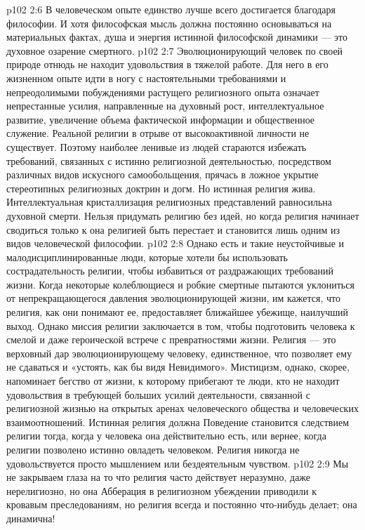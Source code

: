 \vs p102 2:6 В человеческом опыте единство лучше всего достигается благодаря философии. И хотя философская мысль должна постоянно основываться на материальных фактах, душа и энергия истинной философской динамики --- это духовное озарение смертного.
\vs p102 2:7 \pc Эволюционирующий человек по своей природе отнюдь не находит удовольствия в тяжелой работе. Для него в его жизненном опыте идти в ногу с настоятельными требованиями и непреодолимыми побуждениями растущего религиозного опыта означает непрестанные усилия, направленные на духовный рост, интеллектуальное развитие, увеличение объема фактической информации и общественное служение. Реальной религии в отрыве от высокоактивной личности не существует. Поэтому наиболее ленивые из людей стараются избежать требований, связанных с истинно религиозной деятельностью, посредством различных видов искусного самообольщения, прячась в ложное укрытие стереотипных религиозных доктрин и догм. Но истинная религия жива. Интеллектуальная кристаллизация религиозных представлений равносильна духовной смерти. Нельзя придумать религию без идей, но когда религия начинает сводиться только к  она религией быть перестает и становится лишь одним из видов человеческой философии.
\vs p102 2:8 Однако есть и такие неустойчивые и малодисциплинированные люди, которые хотели бы использовать сострадательность религии, чтобы избавиться от раздражающих требований жизни. Когда некоторые колеблющиеся и робкие смертные пытаются уклониться от непрекращающегося давления эволюционирующей жизни, им кажется, что религия, как они понимают ее, предоставляет ближайшее убежище, наилучший выход. Однако миссия религии заключается в том, чтобы подготовить человека к смелой и даже героической встрече с превратностями жизни. Религия --- это верховный дар эволюционирующему человеку, единственное, что позволяет ему не сдаваться и «устоять, как бы видя Невидимого». Мистицизм, однако, скорее, напоминает бегство от жизни, к которому прибегают те люди, кто не находит удовольствия в требующей больших усилий деятельности, связанной с религиозной жизнью на открытых аренах человеческого общества и человеческих взаимоотношений. Истинная религия должна  Поведение становится следствием религии тогда, когда у человека она действительно есть, или вернее, когда религии позволено истинно овладеть человеком. Религия никогда не удовольствуется просто мышлением или бездеятельным чувством.
\vs p102 2:9 Мы не закрываем глаза на то что религия часто действует неразумно, даже нерелигиозно, но она  Абберация в религиозном убеждении приводили к кровавым преследованиям, но религия всегда и постоянно что\hyp{}нибудь делает; она динамична!
